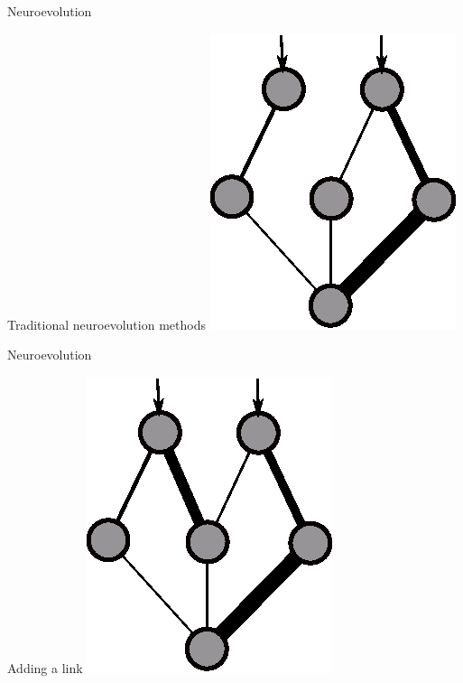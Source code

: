 \documentclass[6pt]{beamer}
\begin{document}
\begin{frame}{Neuroevolution}
\begin{block}{Traditional neuroevolution methods}
\centering
\includegraphics[height=0.7\textheight]{../Figures/Misc/networksMutationWeights2.eps}
\end{block}
\end{frame}

\begin{frame}{Neuroevolution}
\begin{block}{Adding a link}
\centering
\includegraphics[height=0.7\textheight]{../Figures/Misc/networksMutationWeights3.eps}
\end{block}
\end{frame}
\end{document}
